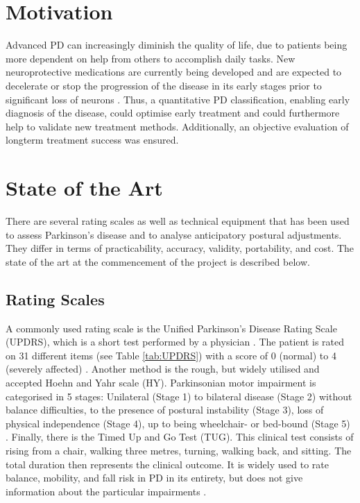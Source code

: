 \section{Motivation}

Advanced PD can increasingly diminish the quality of life, due to patients being more dependent on help from others to accomplish daily tasks. New neuroprotective medications are currently being developed and are expected to decelerate or stop the progression of the disease in its early stages prior to significant loss of neurons \cite{botzel_motivation_2014}\cite{mancini_isway:_2012}. Thus, a quantitative PD classification, enabling early diagnosis of the disease, could optimise early treatment and could furthermore help to validate new treatment methods. Additionally, an objective evaluation of longterm treatment success was ensured.


\section{State of the Art}

There are several rating scales as well as technical equipment that has been used to assess Parkinson's disease and to analyse anticipatory postural adjustments.  They differ in terms of practicability, accuracy, validity, portability, and cost. The state of the art at the commencement of the project is described below.

\subsection{Rating Scales}

A commonly used rating scale is the Unified Parkinson’s Disease Rating Scale (UPDRS), which is a short test performed by a physician \cite{klerk_long-term_2009}. The patient is rated on 31 different items (see Table \ref{tab:UPDRS}) with a score of 0 (normal) to 4 (severely affected) \cite{herndon_handbook_2006}. Another method is the rough, but widely utilised and accepted Hoehn and Yahr scale (HY). Parkinsonian motor impairment is categorised in 5 stages: Unilateral (Stage 1) to bilateral disease (Stage 2) without balance difficulties, to the presence of postural instability (Stage 3), loss of physical independence (Stage 4), up to being wheelchair- or bed-bound (Stage 5) \cite{goetz_movement_2004}. Finally, there is the Timed Up and Go Test (TUG). This clinical test consists of rising from a chair, walking three metres, turning, walking back, and sitting. The total duration then represents the clinical outcome. It is widely used to rate balance, mobility, and fall risk in PD in its entirety, but does not give information about the particular impairments \cite{palmerini_quantification_2013}.

